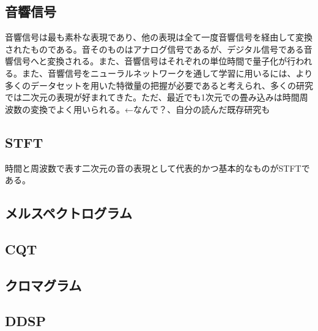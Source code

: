 \subsection{音響信号}

音響信号は最も素朴な表現であり、他の表現は全て一度音響信号を経由して変換されたものである。音そのものはアナログ信号であるが、デジタル信号である音響信号へと変換される。また、音響信号はそれぞれの単位時間で量子化が行われる。また、音響信号をニューラルネットワークを通して学習に用いるには、より多くのデータセットを用いた特徴量の把握が必要であると考えられ、多くの研究では二次元の表現が好まれてきた。ただ、最近でも1次元での畳み込みは時間周波数の変換でよく用いられる。←なんで？、自分の読んだ既存研究も


\subsection{STFT}

時間と周波数で表す二次元の音の表現として代表的かつ基本的なものがSTFTである。

\subsection{メルスペクトログラム}

\subsection{CQT}

\subsection{クロマグラム}

\subsection{DDSP}

